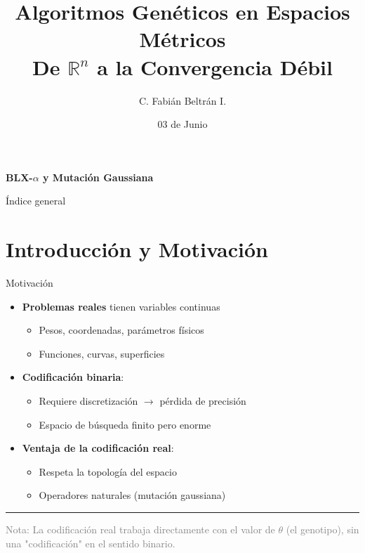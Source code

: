 \documentclass[10pt, aspectratio=169]{beamer}
\title[AGs en Espacios Métricos]{Algoritmos Genéticos en Espacios Métricos\\ {\small De $\mathbb{R}^n$ a la Convergencia Débil}}
\author{C. Fabián Beltrán I.}
\institute{Matemáticas Aplicadas y Computación}
\date{03 de Junio}
\begin{document}
\begin{frame}
\titlepage
\centering
\textbf{BLX-$\alpha$ y Mutación Gaussiana}
\end{frame}

\begin{frame}{Índice general}
\tableofcontents
\end{frame}

\section{Introducción y Motivación}

\begin{frame}{Motivación}
\begin{itemize}
    \item \textbf{Problemas reales} tienen variables \alert{continuas}
    \begin{itemize}
        \item Pesos, coordenadas, parámetros físicos
        \item Funciones, curvas, superficies
    \end{itemize}
    \item \textbf{Codificación binaria}:
    \begin{itemize}
        \item Requiere discretización $\rightarrow$ pérdida de precisión
        \item Espacio de búsqueda finito pero enorme
    \end{itemize}
    \item \textbf{Ventaja de la codificación real}:
    \begin{itemize}
        \item Respeta la topología del espacio
        \item Operadores naturales (mutación gaussiana)
    \end{itemize}
\end{itemize}
\rule{\textwidth}{0.5pt}
\vspace{2mm}
\footnotesize \textcolor{gray}{Nota: La codificación real trabaja directamente con el valor de $\theta$ (el genotipo), sin una "codificación" en el sentido binario.}
\end{frame}
\end{document}
